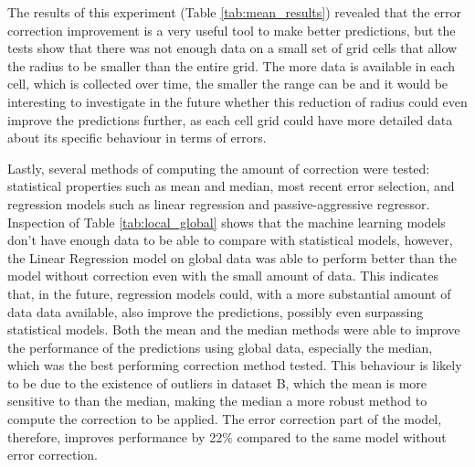 The results of this experiment (Table \ref{tab:mean_results}) revealed that the error correction improvement is a very useful tool to make better predictions, but the tests show that there was not enough data on a small set of grid cells that allow the radius to be smaller than the entire grid. The more data is available in each cell, which is collected over time, the smaller the range can be and it would be interesting to investigate in the future whether this reduction of radius could even improve the predictions further, as each cell grid could have more detailed data about its specific behaviour in terms of errors.



Lastly, several methods of computing the amount of correction were tested: statistical properties such as mean and median, most recent error selection, and regression models such as linear regression and passive-aggressive regressor. Inspection of Table \ref{tab:local_global} shows that the machine learning models don't have enough data to be able to compare with statistical models, however, the Linear Regression model on global data was able to perform better than the model without correction even with the small amount of data. This indicates that, in the future, regression models could, with a more substantial amount of data data available, also improve the predictions, possibly even surpassing statistical models. Both the mean and the median methods were able to improve the performance of the predictions using global data, especially the median, which was the best performing correction method tested. This behaviour is likely to be due to the existence of outliers in dataset B, which the mean is more sensitive to than the median, making the median a more robust method to compute the correction to be applied. The error correction part of the model, therefore, improves performance by 22\% compared to the same model without error correction.

\begin{table}[h]
\centering
{}
\caption{Comparison of different correction calculation methods. The results highlighted correspond to those that improve the model.}
\label{tab:local_global}
\end{table}


